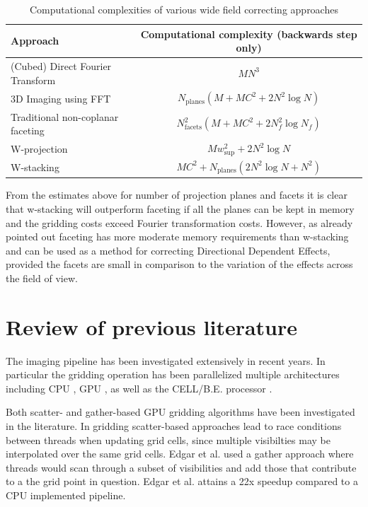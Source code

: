 \begin{table}[ht]
  \centering
  \begin{tabular}[c]{|p{7cm}|c|}
  \hline
  \textbf{Approach} & \textbf{Computational complexity (backwards step only)}\\
  \hline
  (Cubed) Direct Fourier Transform & $MN^3$\\
  \hline
  3D Imaging using FFT &$N_\text{planes}(M + MC^2 + 2N^2\log{N})$\\
  \hline
  Traditional non-coplanar faceting & $N_\text{facets}^2(M + MC^2 + 2N_f^2\log{N_f})$\\
  \hline
  W-projection & $Mw_\text{sup}^2+2N^2\log{N}$\\
  \hline
  W-stacking & $MC^2 + N_\text{planes}(2N^2\log{N} + N^2)$\\
  \hline
  \end{tabular}
  \caption{Computational complexities of various wide field correcting approaches}
  \label{tbl_computational complexities}
\end{table}

From the estimates above for number of projection planes and facets it is clear that w-stacking will outperform faceting if all the planes can be kept in memory and the gridding costs exceed Fourier transformation costs. 
However, as already pointed out faceting has more moderate memory requirements than w-stacking and can be used as a method for correcting Directional Dependent Effects, provided the facets are small in comparison to the 
variation of the effects across the field of view.

\section{Review of previous literature}
The imaging pipeline has been investigated extensively in recent years. In particular the gridding operation has been parallelized multiple architectures including CPU \cite{offringa2014wsclean,golap2015mutithreading,obitfaceting}, 
GPU \cite{humphreys2011analysis,romein2012efficient,muscat2014high,edgar2010enabling}, as well as the CELL/B.E. processor \cite{varbanescu2008performance}. 

Both scatter- and gather-based GPU gridding algorithms have been investigated in the literature. In gridding scatter-based approaches lead to race conditions between
threads when updating grid cells, since multiple visibilties may be interpolated over the same grid cells. Edgar et al. \cite{edgar2010enabling} used a gather approach where 
threads would scan through a subset of visibilities and add those that contribute to a the grid point in question. Edgar et al. attains a 22x speedup compared to a CPU implemented pipeline.  

